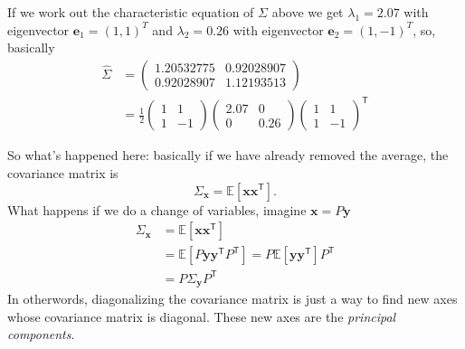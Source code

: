 \documentclass[12pt]{article}
\begin{document}
If we work out the characteristic equation of $\Sigma$ above we get
$\lambda_1=2.07$ with eigenvector $\mathbf{e}_1=(1,1)^T$ and
$\lambda_2=0.26$ with eigenvector $\mathbf{e}_2=(1,-1)^T$, so, basically
\begin{equation}
\begin{aligned}
\hat{\Sigma}
&=\begin{pmatrix}
1.20532775 & 0.92028907\\
0.92028907 & 1.12193513
\end{pmatrix} \\
&=\frac{1}{2}
\begin{pmatrix}
1 & 1\\
1 & -1
\end{pmatrix}
\begin{pmatrix}
2.07 & 0\\
0 & 0.26
\end{pmatrix}
\begin{pmatrix}
1 & 1\\
1 & -1
\end{pmatrix}^{\mathsf T}
\end{aligned}
\end{equation}

So what's happened here: basically if we have already removed the average, the covariance matrix is
\begin{equation}
\Sigma_\mathbf{x}
=
\mathbb{E}\!\left[\mathbf{x}\mathbf{x}^{\mathsf T}\right].
\end{equation}
What happens if we do a change of variables, imagine $\mathbf{x}=P\mathbf{y}$
\begin{equation}
\begin{aligned}
  \Sigma_{\mathbf{x}}
&=
\mathbb{E}\!\left[\mathbf{x}\mathbf{x}^{\mathsf T}\right]\\
&=
\mathbb{E}\!\left[P\mathbf{y}\mathbf{y}^{\mathsf T}P^{\mathsf T}\right]=P\mathbb{E}\!\left[\mathbf{y}\mathbf{y}^{\mathsf T}\right]P^{\mathsf T}\\
&=P\Sigma_{\mathbf{y}}P^{\mathsf T}
\end{aligned}
\end{equation}
In otherwords, diagonalizing the covariance matrix is just a way to
find new axes whose covariance matrix is diagonal. These new axes are
the \textsl{principal components}.
\end{document}
